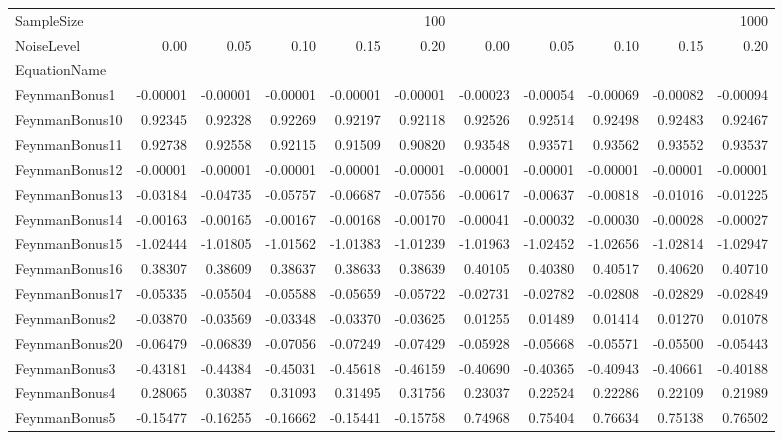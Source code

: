 \begin{tabular}{lrrrrrrrrrr}
\toprule
SampleSize & \multicolumn{5}{r}{100} & \multicolumn{5}{r}{1000} \\
NoiseLevel & 0.00 & 0.05 & 0.10 & 0.15 & 0.20 & 0.00 & 0.05 & 0.10 & 0.15 & 0.20 \\
EquationName &  &  &  &  &  &  &  &  &  &  \\
\midrule
FeynmanBonus1 & -0.00001 & -0.00001 & -0.00001 & -0.00001 & -0.00001 & -0.00023 & -0.00054 & -0.00069 & -0.00082 & -0.00094 \\
FeynmanBonus10 & 0.92345 & 0.92328 & 0.92269 & 0.92197 & 0.92118 & 0.92526 & 0.92514 & 0.92498 & 0.92483 & 0.92467 \\
FeynmanBonus11 & 0.92738 & 0.92558 & 0.92115 & 0.91509 & 0.90820 & 0.93548 & 0.93571 & 0.93562 & 0.93552 & 0.93537 \\
FeynmanBonus12 & -0.00001 & -0.00001 & -0.00001 & -0.00001 & -0.00001 & -0.00001 & -0.00001 & -0.00001 & -0.00001 & -0.00001 \\
FeynmanBonus13 & -0.03184 & -0.04735 & -0.05757 & -0.06687 & -0.07556 & -0.00617 & -0.00637 & -0.00818 & -0.01016 & -0.01225 \\
FeynmanBonus14 & -0.00163 & -0.00165 & -0.00167 & -0.00168 & -0.00170 & -0.00041 & -0.00032 & -0.00030 & -0.00028 & -0.00027 \\
FeynmanBonus15 & -1.02444 & -1.01805 & -1.01562 & -1.01383 & -1.01239 & -1.01963 & -1.02452 & -1.02656 & -1.02814 & -1.02947 \\
FeynmanBonus16 & 0.38307 & 0.38609 & 0.38637 & 0.38633 & 0.38639 & 0.40105 & 0.40380 & 0.40517 & 0.40620 & 0.40710 \\
FeynmanBonus17 & -0.05335 & -0.05504 & -0.05588 & -0.05659 & -0.05722 & -0.02731 & -0.02782 & -0.02808 & -0.02829 & -0.02849 \\
FeynmanBonus2 & -0.03870 & -0.03569 & -0.03348 & -0.03370 & -0.03625 & 0.01255 & 0.01489 & 0.01414 & 0.01270 & 0.01078 \\
FeynmanBonus20 & -0.06479 & -0.06839 & -0.07056 & -0.07249 & -0.07429 & -0.05928 & -0.05668 & -0.05571 & -0.05500 & -0.05443 \\
FeynmanBonus3 & -0.43181 & -0.44384 & -0.45031 & -0.45618 & -0.46159 & -0.40690 & -0.40365 & -0.40943 & -0.40661 & -0.40188 \\
FeynmanBonus4 & 0.28065 & 0.30387 & 0.31093 & 0.31495 & 0.31756 & 0.23037 & 0.22524 & 0.22286 & 0.22109 & 0.21989 \\
FeynmanBonus5 & -0.15477 & -0.16255 & -0.16662 & -0.15441 & -0.15758 & 0.74968 & 0.75404 & 0.76634 & 0.75138 & 0.76502 \\

\end{tabular}
